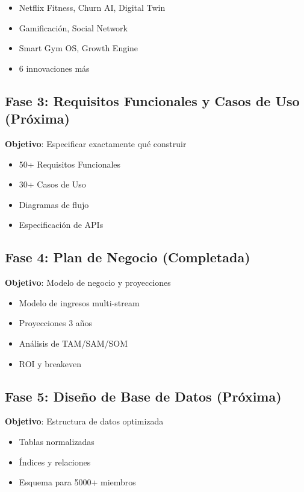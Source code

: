 \documentclass[11pt,a4paper]{article}
\begin{document}
\begin{itemize}
\begin{itemize}
    \item Netflix Fitness, Churn AI, Digital Twin
    \item Gamificación, Social Network
    \item Smart Gym OS, Growth Engine
    \item 6 innovaciones más
\end{itemize}

\subsection{Fase 3: Requisitos Funcionales y Casos de Uso (Próxima)}

\textbf{Objetivo}: Especificar exactamente qué construir

\begin{itemize}
    \item 50+ Requisitos Funcionales
    \item 30+ Casos de Uso
    \item Diagramas de flujo
    \item Especificación de APIs
\end{itemize}

\subsection{Fase 4: Plan de Negocio (Completada)}

\textbf{Objetivo}: Modelo de negocio y proyecciones

\begin{itemize}
    \item Modelo de ingresos multi-stream
    \item Proyecciones 3 años
    \item Análisis de TAM/SAM/SOM
    \item ROI y breakeven
\end{itemize}

\subsection{Fase 5: Diseño de Base de Datos (Próxima)}

\textbf{Objetivo}: Estructura de datos optimizada

\begin{itemize}
    \item Tablas normalizadas
    \item Índices y relaciones
    \item Esquema para 5000+ miembros
\end{itemize}


\end{itemize}
\end{document}
